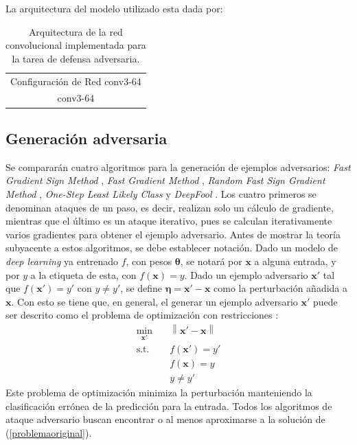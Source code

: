 \documentclass[conference]{IEEEtran}
\newcommand{\norm}[1]{\left\lVert#1\right\rVert}
\begin{document}
La arquitectura del modelo utilizado esta dada por:

\begin{table}[!t]
    \centering
    \caption{Arquitectura de la red convolucional implementada para la tarea de defensa adversaria.}
    \label{defense_model}
    \begin{tabular}{c} 
    \toprule 
    Configuración de Red
    \midrule
     conv3-64 \\ conv3-64 
    \bottomrule
    \end{tabular}
\end{table}

\subsection{Generación adversaria}
Se compararán cuatro algoritmos para la generación de ejemplos adversarios: \textit{Fast Gradient Sign Method} \cite{goodfellow2014}, \textit{Fast Gradient Method} \cite{kurakin2016}, \textit{Random Fast Sign Gradient Method} \cite{tramer2017}, \textit{One-Step Least Likely Class} \cite{kurakin2016} y \textit{DeepFool} \cite{deepfool}. Los cuatro primeros se denominan ataques de un paso, es decir, realizan solo un cálculo de gradiente, mientras que el último es un ataque iterativo, pues se calculan iterativamente varios gradientes \cite{kurakin2016} para obtener el ejemplo adversario. Antes de mostrar la teoría subyacente a estos algoritmos, se debe establecer notación. Dado un modelo de \textit{deep learning} ya entrenado $f$, con pesos $\bm{\theta}$, se notará por $\bm{x}$ a alguna entrada, y por $y$ a la etiqueta de esta, con $f(\bm{x})=y$. Dado un ejemplo adversario $\bm{x}'$ tal que $f(\bm{x}')=y'$ con $y \neq y'$, se define $\bm{\eta} = \bm{x}' - \bm{x}$ como la perturbación añadida a $\bm{x}$. Con esto se tiene que, en general, el generar un ejemplo adversario $\bm{x}'$ puede ser descrito como el problema de optimización con restricciones \cite{yuan2017}:
\begin{equation}\label{problemaoriginal}
	\begin{aligned}
		\min_{\bm{x}'} \quad&\norm{\bm{x'}-\bm{x}} \\
	\text{s.t.} \quad &f(\bm{x'})=y'\\
	&f(\bm{x})=y \\
	&y \neq y'
\end{aligned}
\end{equation}
Este problema de optimización minimiza la perturbación manteniendo la clasificación errónea de la predicción para la entrada. Todos los algoritmos de ataque adversario buscan encontrar o al menos aproximarse a la solución de (\ref{problemaoriginal}). 
\end{document}
